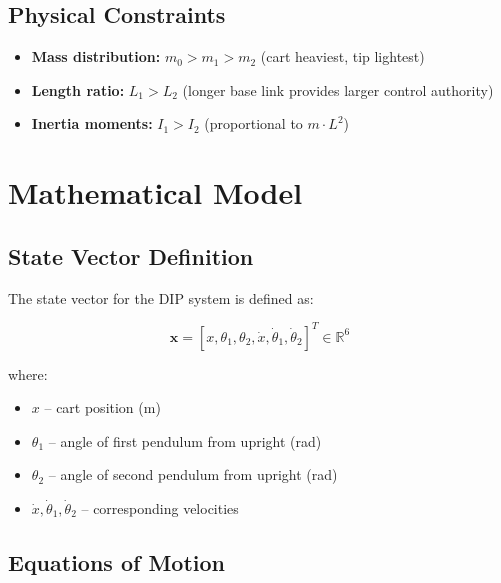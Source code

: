 \documentclass[11pt,a4paper]{article}
\begin{document}
\subsection{Physical Constraints}

\begin{itemize}
    \item \textbf{Mass distribution:} $m_0 > m_1 > m_2$ (cart heaviest, tip lightest)
    \item \textbf{Length ratio:} $L_1 > L_2$ (longer base link provides larger control authority)
    \item \textbf{Inertia moments:} $I_1 > I_2$ (proportional to $m \cdot L^2$)
\end{itemize}


\section{Mathematical Model}

\subsection{State Vector Definition}

The state vector for the DIP system is defined as:

\begin{equation}
    \mathbf{x} = [x, \theta_1, \theta_2, \dot{x}, \dot{\theta}_1, \dot{\theta}_2]^T \in \mathbb{R}^6
\end{equation}

where:
\begin{itemize}
    \item $x$ -- cart position (m)
    \item $\theta_1$ -- angle of first pendulum from upright (rad)
    \item $\theta_2$ -- angle of second pendulum from upright (rad)
    \item $\dot{x}, \dot{\theta}_1, \dot{\theta}_2$ -- corresponding velocities
\end{itemize}

\subsection{Equations of Motion}
\end{document}
